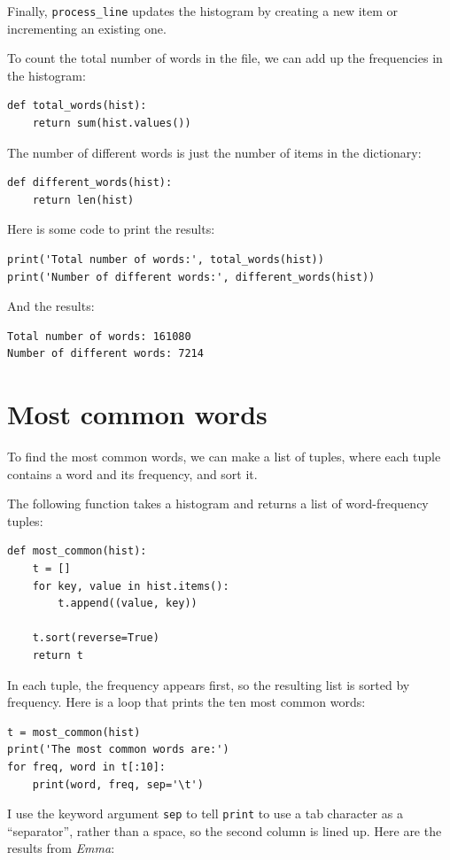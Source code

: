 \documentclass[10pt]{book}
\begin{document}
Finally, \verb"process_line" updates the histogram by creating a new
item or incrementing an existing one.

To count the total number of words in the file, we can add up
the frequencies in the histogram:

\begin{verbatim}
def total_words(hist):
    return sum(hist.values())
\end{verbatim}
%
The number of different words is just the number of items in
the dictionary:

\begin{verbatim}
def different_words(hist):
    return len(hist)
\end{verbatim}
%
Here is some code to print the results:

\begin{verbatim}
print('Total number of words:', total_words(hist))
print('Number of different words:', different_words(hist))
\end{verbatim}
%
And the results:

\begin{verbatim}
Total number of words: 161080
Number of different words: 7214
\end{verbatim}
%

\section{Most common words}

To find the most common words, we can make a list of tuples,
where each tuple contains a word and its frequency,
and sort it.

The following function takes a histogram and returns a list of
word-frequency tuples:

\begin{verbatim}
def most_common(hist):
    t = []
    for key, value in hist.items():
        t.append((value, key))

    t.sort(reverse=True)
    return t
\end{verbatim}

In each tuple, the frequency appears first, so the resulting list is
sorted by frequency.  Here is a loop that prints the ten most common
words:

\begin{verbatim}
t = most_common(hist)
print('The most common words are:')
for freq, word in t[:10]:
    print(word, freq, sep='\t')
\end{verbatim}
%
I use the keyword argument {\tt sep} to tell {\tt print} to use a tab
character as a ``separator'', rather than a space, so the second
column is lined up.  Here are the results from {\em Emma}:
\end{document}
